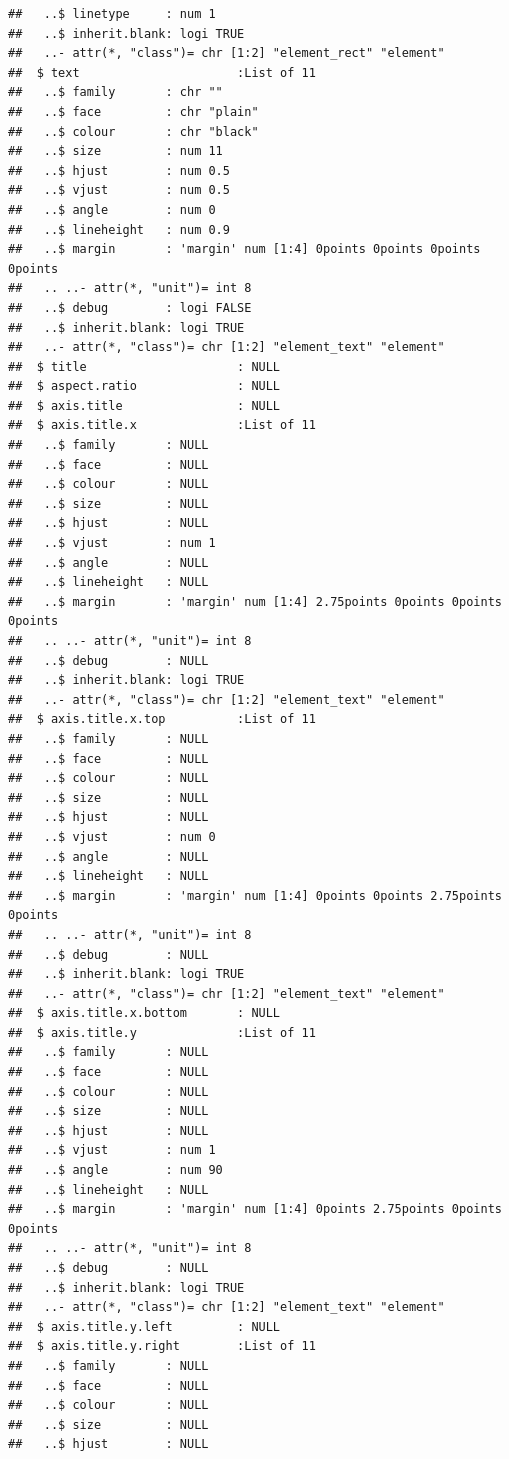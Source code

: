 \documentclass{article}\usepackage[]{graphicx}\usepackage[]{color}
\makeatletter
\newenvironment{kframe}{%
 \def\at@end@of@kframe{}%
 \ifinner\ifhmode%
  \def\at@end@of@kframe{\end{minipage}}%
  \begin{minipage}{\columnwidth}%
 \fi\fi%
 \def\FrameCommand##1{\hskip\@totalleftmargin \hskip-\fboxsep
 \colorbox{shadecolor}{##1}\hskip-\fboxsep
     \hskip-\linewidth \hskip-\@totalleftmargin \hskip\columnwidth}%
 \MakeFramed {\advance\hsize-\width
   \@totalleftmargin\z@ \linewidth\hsize
   \@setminipage}}%
 {\par\unskip\endMakeFramed%
 \at@end@of@kframe}
\newenvironment{knitrout}{}{} %
\makeatother
\begin{document}
\begin{enumerate}
\begin{enumerate}
\begin{knitrout}
\begin{kframe}
\begin{verbatim}
##   ..$ linetype     : num 1
##   ..$ inherit.blank: logi TRUE
##   ..- attr(*, "class")= chr [1:2] "element_rect" "element"
##  $ text                      :List of 11
##   ..$ family       : chr ""
##   ..$ face         : chr "plain"
##   ..$ colour       : chr "black"
##   ..$ size         : num 11
##   ..$ hjust        : num 0.5
##   ..$ vjust        : num 0.5
##   ..$ angle        : num 0
##   ..$ lineheight   : num 0.9
##   ..$ margin       : 'margin' num [1:4] 0points 0points 0points 0points
##   .. ..- attr(*, "unit")= int 8
##   ..$ debug        : logi FALSE
##   ..$ inherit.blank: logi TRUE
##   ..- attr(*, "class")= chr [1:2] "element_text" "element"
##  $ title                     : NULL
##  $ aspect.ratio              : NULL
##  $ axis.title                : NULL
##  $ axis.title.x              :List of 11
##   ..$ family       : NULL
##   ..$ face         : NULL
##   ..$ colour       : NULL
##   ..$ size         : NULL
##   ..$ hjust        : NULL
##   ..$ vjust        : num 1
##   ..$ angle        : NULL
##   ..$ lineheight   : NULL
##   ..$ margin       : 'margin' num [1:4] 2.75points 0points 0points 0points
##   .. ..- attr(*, "unit")= int 8
##   ..$ debug        : NULL
##   ..$ inherit.blank: logi TRUE
##   ..- attr(*, "class")= chr [1:2] "element_text" "element"
##  $ axis.title.x.top          :List of 11
##   ..$ family       : NULL
##   ..$ face         : NULL
##   ..$ colour       : NULL
##   ..$ size         : NULL
##   ..$ hjust        : NULL
##   ..$ vjust        : num 0
##   ..$ angle        : NULL
##   ..$ lineheight   : NULL
##   ..$ margin       : 'margin' num [1:4] 0points 0points 2.75points 0points
##   .. ..- attr(*, "unit")= int 8
##   ..$ debug        : NULL
##   ..$ inherit.blank: logi TRUE
##   ..- attr(*, "class")= chr [1:2] "element_text" "element"
##  $ axis.title.x.bottom       : NULL
##  $ axis.title.y              :List of 11
##   ..$ family       : NULL
##   ..$ face         : NULL
##   ..$ colour       : NULL
##   ..$ size         : NULL
##   ..$ hjust        : NULL
##   ..$ vjust        : num 1
##   ..$ angle        : num 90
##   ..$ lineheight   : NULL
##   ..$ margin       : 'margin' num [1:4] 0points 2.75points 0points 0points
##   .. ..- attr(*, "unit")= int 8
##   ..$ debug        : NULL
##   ..$ inherit.blank: logi TRUE
##   ..- attr(*, "class")= chr [1:2] "element_text" "element"
##  $ axis.title.y.left         : NULL
##  $ axis.title.y.right        :List of 11
##   ..$ family       : NULL
##   ..$ face         : NULL
##   ..$ colour       : NULL
##   ..$ size         : NULL
##   ..$ hjust        : NULL

\end{verbatim}
\end{kframe}
\end{knitrout}
\end{enumerate}
\end{enumerate}
\end{document}
